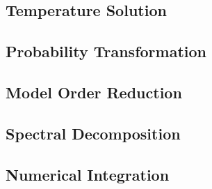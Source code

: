 \subsection{Temperature Solution} 


\subsection{Probability Transformation} 


\subsection{Model Order Reduction} 


\subsection{Spectral Decomposition} 


\subsection{Numerical Integration} 

